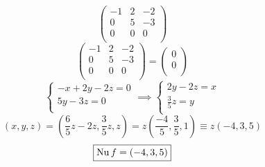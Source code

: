 \documentclass[../practica.root.tex]{subfiles}
\begin{document}
\begin{enumerate}
\[              \begin{pmatrix}
                  -1 & 2 & -2 \\
                  0  & 5 & -3 \\
                  0  & 0 & 0  \\
              \end{pmatrix}
          \] \[
              \begin{pmatrix}
                  -1 & 2 & -2 \\
                  0  & 5 & -3 \\
                  0  & 0 & 0  \\
              \end{pmatrix} = \begin{pmatrix}
                  0 \\ 0 \\
              \end{pmatrix}
          \] \[
              \begin{cases}
                  -x + 2y - 2z = 0 \\
                  5y - 3z = 0      \\
              \end{cases}
              \implies
              \begin{cases}
                  2y - 2z = x      \\
                  \frac{3}{5}z = y \\
              \end{cases}
          \] \[
              (x,y,z) = \left(\frac{6}{5}z - 2z, \frac{3}{5}z, z\right) = z\left(\frac{-4}{5}, \frac{3}{5}, 1\right) \equiv z(-4,3,5)
          \] \[
              \boxed{\operatorname{Nu} f = (-4,3,5)}
          \]


\end{enumerate}
\end{document}
